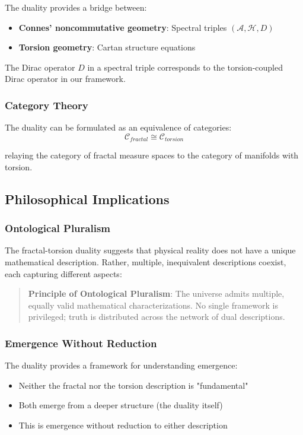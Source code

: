 The duality provides a bridge between:
\begin{itemize}
    \item \textbf{Connes' noncommutative geometry}: Spectral triples $(\mathcal{A}, \mathcal{H}, D)$
    \item \textbf{Torsion geometry}: Cartan structure equations
\end{itemize}

The Dirac operator $D$ in a spectral triple corresponds to the torsion-coupled Dirac operator in our framework.

\subsubsection{Category Theory}

The duality can be formulated as an equivalence of categories:
\begin{equation}
    \mathcal{C}_{fractal} \cong \mathcal{C}_{torsion}
\end{equation}

relaying the category of fractal measure spaces to the category of manifolds with torsion.

\subsection{Philosophical Implications}

\subsubsection{Ontological Pluralism}

The fractal-torsion duality suggests that physical reality does not have a unique mathematical description. Rather, multiple, inequivalent descriptions coexist, each capturing different aspects:

\begin{quote}
\textbf{Principle of Ontological Pluralism}: The universe admits multiple, equally valid mathematical characterizations. No single framework is privileged; truth is distributed across the network of dual descriptions.
\end{quote}

\subsubsection{Emergence Without Reduction}

The duality provides a framework for understanding emergence:
\begin{itemize}
    \item Neither the fractal nor the torsion description is "fundamental"
    \item Both emerge from a deeper structure (the duality itself)
    \item This is emergence without reduction to either description
\end{itemize}

